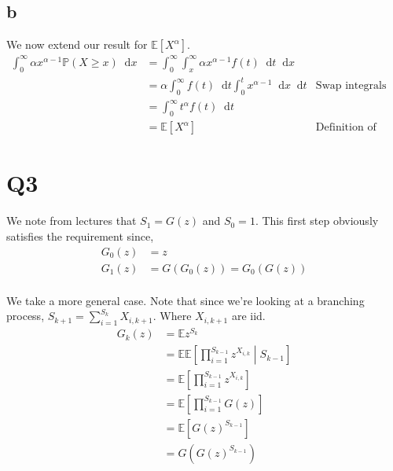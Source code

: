 \documentclass{article}
\newcommand{\diff}{\mathop{}\!\mathrm{d}}
\newcommand{\prob}{\mathbb{P}}
\newcommand{\expect}{\mathbb{E}}
\begin{document}
\subsection{b}
We now extend our result for $\expect\left[X^\alpha\right]$.
\begin{align*}
    \int_0^\infty \alpha x^{\alpha-1} \prob(X \geq x) \diff x
    &= \int_0^\infty \int_x^\infty \alpha x^{\alpha-1} f(t) \diff t \diff x \\
    &= \alpha \int_0^\infty f(t) \diff t \int_0^t x^{\alpha-1} \diff x \diff t
    & \text{Swap integrals} \\
    &= \int_0^\infty t^\alpha f(t) \diff t \\
    &= \expect \left[X^\alpha\right] & \text{Definition of expectation}
\end{align*}

\section{Q3}
We note from lectures that $S_1 = G(z)$ and $S_0 = 1$. This first step
obviously satisfies the requirement since,
\begin{align*}
    G_0(z) &= z \\
    G_1(z) &= G(G_0(z)) = G_0(G(z)) \\
\end{align*}

We take a more general case. Note that since we're looking at a branching
process, $S_{k+1} = \sum_{i=1}^{S_k} X_{i,k+1}$. Where $X_{i,k+1}$ are iid.
\begin{align*}
    G_k(z) &= \expect z^{S_k} \\
    &= \expect \expect\left[ \prod_{i=1}^{S_{k-1}} z^{X_{i,k}} \middle| S_{k-1} \right] \\
    &= \expect \left[ \prod_{i=1}^{S_{k-1}} z^{X_{i,k}} \right] \\
    &= \expect \left[ \prod_{i=1}^{S_{k-1}} G(z) \right] \\
    &= \expect \left[ G{(z)}^{S_{k-1}} \right] \\
    &= G\left( G{(z)}^{S_{k-1}} \right) \\
\end{align*}

\end{document}

